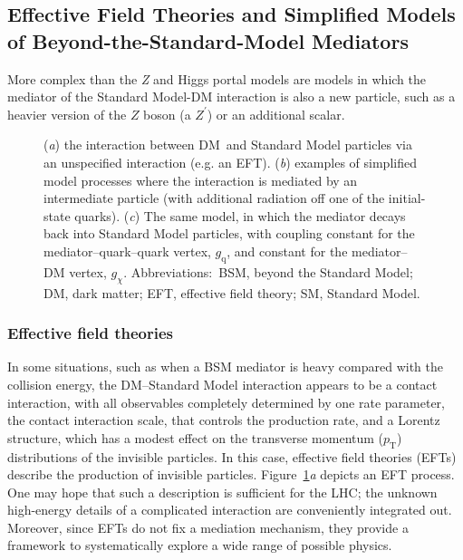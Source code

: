 \documentclass{ar-1col}
\newcommand{\chiDM}{\ensuremath{\chi}\xspace}
\newcommand{\IP}{invisible particle}
\newcommand{\gDM}{\ensuremath{g_{\chiDM}}\xspace}
\newcommand{\gdm}{\gDM}
\newcommand{\gq}{$g_{\mathrm{q}}$\xspace}
\newcommand{\pt}{\ensuremath{p_\mathrm{T}}\xspace}
\begin{document}
\subsection{Effective Field Theories and Simplified Models of Beyond-the-Standard-Model Mediators}\label{sec:BSMMediatorModels}

More complex than the \textit{Z} and Higgs portal
models are models in which the mediator of the
Standard Model-DM interaction is also a new particle, such
as a heavier version of the $Z$ boson (a $Z^\prime$) or an
additional scalar.

\begin{figure}[!htpb]
\caption{(\textit{a}) the interaction between DM\ and Standard Model particles via an unspecified interaction (e.g. an EFT).
(\textit{b}) examples of simplified model processes where the interaction is mediated by an intermediate particle (with additional radiation off one of the initial-state quarks). 
(\textit{c}) The same model, in which  the mediator decays back into Standard Model particles, with coupling constant for the mediator--quark--quark vertex, \gq, and constant for the mediator--DM vertex, \gdm. 
Abbreviations:\ BSM, beyond the Standard Model; DM, dark matter; EFT, effective field theory; SM, Standard Model. }
\label{fig:feynman_0}
\end{figure}


\subsubsection{Effective field theories}\label{sub:EFT}

In some situations, such as when a BSM mediator is heavy compared
with the collision energy, the DM--Standard Model interaction appears to be a
contact interaction, with all observables completely determined by
one rate parameter, the contact interaction scale, that controls
the production rate, and a Lorentz structure, which has a
modest effect on the transverse momentum (\pt) distributions of the
{\IP}s. In this case, effective field theories
(EFTs)~\cite{Beltran:2010ww,Goodman:2010ku,Bai:2010hh,Fox:2011pm} describe the production of {\IP}s. Figure~\ref{fig:feynman_0}\textit{a} depicts an EFT
process. One may
hope that such a description is sufficient for the LHC; the
unknown high-energy details of a complicated interaction are
conveniently integrated out. Moreover, since EFTs do not fix a
mediation mechanism, they provide a framework to systematically
explore a wide range of possible physics.
\end{document}
